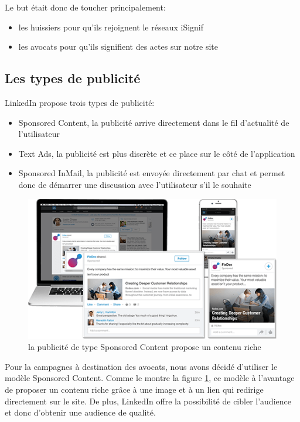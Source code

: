 \documentclass[]{report}
\begin{document}
    Le but était donc de toucher principalement:

    \begin{itemize}
        \item les huissiers pour qu'ils rejoignent le réseaux iSignif
        \item les avocats pour qu'ils signifient des actes sur notre site
    \end{itemize}

    \subsection{Les types de publicité}

      LinkedIn propose trois types de publicité:

      \begin{itemize}
        \item Sponsored Content, la publicité arrive directement dans le fil d'actualité de l'utilisateur
        \item Text Ads, la publicité est plus discrète et ce place sur le côté de l'application
        \item Sponsored InMail, la publicité est envoyée directement par chat et permet donc de démarrer une discussion avec l'utilisateur s'il le souhaite
      \end{itemize}

      \begin{figure}
        \includegraphics[width=\linewidth]{img/linkedin_sponsored_content.png}
        \caption{la publicité de type Sponsored Content propose un contenu riche}
        \label{linkedin_sponsored_content}
      \end{figure}

      Pour la campagnes à destination des avocats, nous avons décidé d’utiliser le modèle Sponsored Content. Comme le montre la figure \ref{linkedin_sponsored_content}, ce modèle à l'avantage de proposer un contenu riche grâce à une image et à un lien qui redirige directement sur le site. De plus, LinkedIn offre la possibilité de cibler l'audience et donc d'obtenir une audience de qualité.
\end{document}
